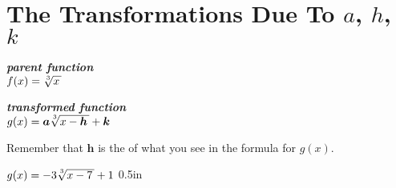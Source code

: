 \section{The Transformations Due To $a$, $h$, $k$}

\begin{tcbraster}[
    raster equal height,
    raster left skip = 1in, raster right skip = 1in, 
    raster column skip = 0.5in,
    raster before skip = 1\baselineskip, raster after skip = 1\baselineskip,
    ]
    \begin{tcolorbox}[]
        \centering
        {\bfseries\itshape parent function}\\[0.5\baselineskip]
        \large
        $f(x) = \myRoot[3]{x}$
    \end{tcolorbox}
    \begin{tcolorbox}[]
        \centering
        {\bfseries\itshape transformed function}\\[0.5\baselineskip]
        \large
        $g(x) = \bm{a} \myRoot[3]{x-\bm{h}} + \bm{k}$
    \end{tcolorbox}
\end{tcbraster}

\begin{tcbraster}[]
\end{tcbraster}


\begin{myWarningBox}
    \begin{center}
        Remember that $\bm{h}$ is the  
        of what you see in the formula for $g(x)$.
    \end{center}
\end{myWarningBox}




{
    $g(x) = -3\myRoot[3]{x-7} + 1$
}{0.5in}


